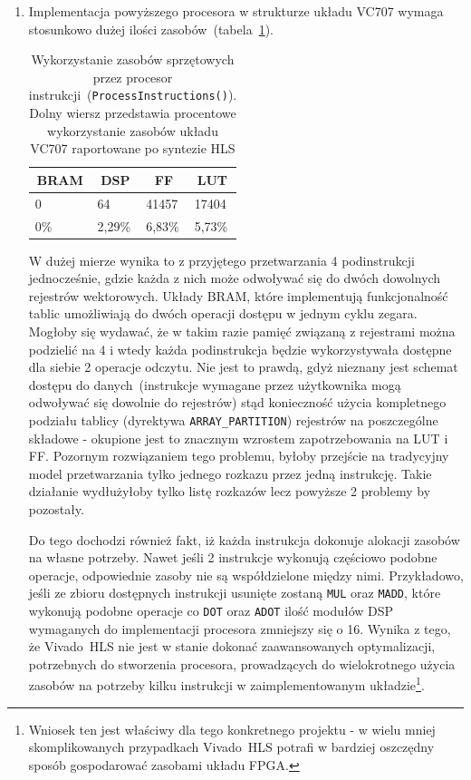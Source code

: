 \begin{enumerate}
\item Implementacja powyższego procesora w strukturze układu VC707 wymaga stosunkowo dużej ilości zasobów~(tabela~\ref{ch3:tab:spu_util}). 

\begin{table}[H]
\centering
\caption[Wykorzystanie zasobów sprzętowych przez procesor instrukcji]{Wykorzystanie zasobów sprzętowych przez procesor instrukcji~(\texttt{ProcessInstructions()}). Dolny wiersz przedstawia procentowe wykorzystanie zasobów układu VC707 raportowane po syntezie HLS}
\label{ch3:tab:spu_util}
\begin{tabular}{|l|l|l|l|}
\hline
\multicolumn{1}{|c|}{\textbf{BRAM}} & \multicolumn{1}{c|}{\textbf{DSP}} & \multicolumn{1}{c|}{\textbf{FF}} & \multicolumn{1}{c|}{\textbf{LUT}} \\ \hline
0                                   & 64                                & 41457                            & 17404                             \\ \hline\hline
0\%                                 & 2,29\%                            & 6,83\%                           & 5,73\%                            \\ \hline
\end{tabular}
\end{table}

W dużej mierze wynika to z przyjętego przetwarzania 4 podinstrukcji jednocześnie, gdzie każda z nich może odwoływać się do dwóch dowolnych rejestrów wektorowych. Układy BRAM, które implementują funkcjonalność tablic umożliwiają do dwóch operacji dostępu w jednym cyklu zegara. Mogłoby się wydawać, że w takim razie pamięć związaną z rejestrami można podzielić na 4 i wtedy każda podinstrukcja będzie wykorzystywała dostępne dla siebie 2 operacje odczytu. Nie jest to prawdą, gdyż nieznany jest schemat dostępu do danych~(instrukcje wymagane przez użytkownika mogą odwoływać się dowolnie do rejestrów) stąd konieczność użycia kompletnego podziału tablicy (dyrektywa \texttt{ARRAY\_PARTITION}) rejestrów na poszczególne składowe - okupione jest to znacznym wzrostem zapotrzebowania na LUT i FF. Pozornym rozwiązaniem tego problemu, byłoby przejście na tradycyjny model przetwarzania tylko jednego rozkazu przez jedną instrukcję. Takie działanie wydłużyłoby tylko listę rozkazów lecz powyższe 2 problemy by pozostały.

Do tego dochodzi również fakt, iż każda instrukcja dokonuje alokacji zasobów na własne potrzeby. Nawet jeśli 2 instrukcje wykonują częściowo podobne operacje, odpowiednie zasoby nie są współdzielone między nimi. Przykładowo, jeśli ze zbioru dostępnych instrukcji usunięte zostaną \texttt{MUL} oraz \texttt{MADD}, które wykonują podobne operacje co \texttt{DOT} oraz \texttt{ADOT} ilość modułów DSP wymaganych do implementacji procesora zmniejszy się o 16. Wynika z tego, że Vivado~HLS nie jest w stanie dokonać zaawansowanych optymalizacji, potrzebnych do stworzenia procesora, prowadzących do wielokrotnego użycia zasobów na potrzeby kilku instrukcji w zaimplementowanym układzie\footnote{Wniosek ten jest właściwy dla tego konkretnego projektu - w wielu mniej skomplikowanych przypadkach Vivado~HLS potrafi w bardziej oszczędny sposób gospodarować zasobami układu FPGA. }.


\end{enumerate}

